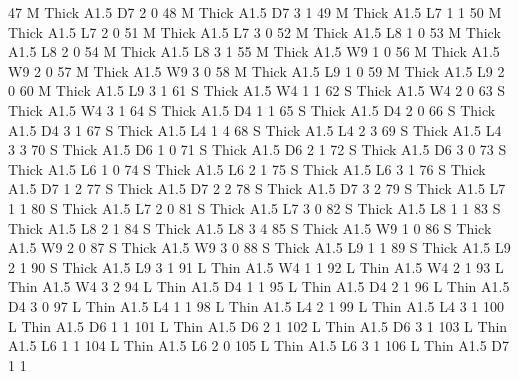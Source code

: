 \documentclass{article}
\begin{document}
\begin{Schunk}
\begin{Soutput}
47        M  Thick A1.5      D7     2     0
48        M  Thick A1.5      D7     3     1
49        M  Thick A1.5      L7     1     1
50        M  Thick A1.5      L7     2     0
51        M  Thick A1.5      L7     3     0
52        M  Thick A1.5      L8     1     0
53        M  Thick A1.5      L8     2     0
54        M  Thick A1.5      L8     3     1
55        M  Thick A1.5      W9     1     0
56        M  Thick A1.5      W9     2     0
57        M  Thick A1.5      W9     3     0
58        M  Thick A1.5      L9     1     0
59        M  Thick A1.5      L9     2     0
60        M  Thick A1.5      L9     3     1
61        S  Thick A1.5      W4     1     1
62        S  Thick A1.5      W4     2     0
63        S  Thick A1.5      W4     3     1
64        S  Thick A1.5      D4     1     1
65        S  Thick A1.5      D4     2     0
66        S  Thick A1.5      D4     3     1
67        S  Thick A1.5      L4     1     4
68        S  Thick A1.5      L4     2     3
69        S  Thick A1.5      L4     3     3
70        S  Thick A1.5      D6     1     0
71        S  Thick A1.5      D6     2     1
72        S  Thick A1.5      D6     3     0
73        S  Thick A1.5      L6     1     0
74        S  Thick A1.5      L6     2     1
75        S  Thick A1.5      L6     3     1
76        S  Thick A1.5      D7     1     2
77        S  Thick A1.5      D7     2     2
78        S  Thick A1.5      D7     3     2
79        S  Thick A1.5      L7     1     1
80        S  Thick A1.5      L7     2     0
81        S  Thick A1.5      L7     3     0
82        S  Thick A1.5      L8     1     1
83        S  Thick A1.5      L8     2     1
84        S  Thick A1.5      L8     3     4
85        S  Thick A1.5      W9     1     0
86        S  Thick A1.5      W9     2     0
87        S  Thick A1.5      W9     3     0
88        S  Thick A1.5      L9     1     1
89        S  Thick A1.5      L9     2     1
90        S  Thick A1.5      L9     3     1
91        L   Thin A1.5      W4     1     1
92        L   Thin A1.5      W4     2     1
93        L   Thin A1.5      W4     3     2
94        L   Thin A1.5      D4     1     1
95        L   Thin A1.5      D4     2     1
96        L   Thin A1.5      D4     3     0
97        L   Thin A1.5      L4     1     1
98        L   Thin A1.5      L4     2     1
99        L   Thin A1.5      L4     3     1
100       L   Thin A1.5      D6     1     1
101       L   Thin A1.5      D6     2     1
102       L   Thin A1.5      D6     3     1
103       L   Thin A1.5      L6     1     1
104       L   Thin A1.5      L6     2     0
105       L   Thin A1.5      L6     3     1
106       L   Thin A1.5      D7     1     1

\end{Soutput}
\end{Schunk}
\end{document}

